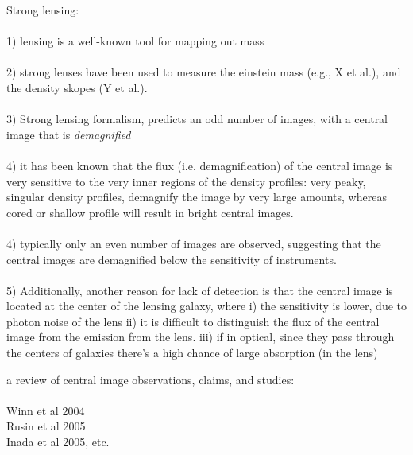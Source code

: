 \documentclass[chicago]{emulateapj}
\begin{document}
\begin{framed}
Strong lensing: \\  \\
1) lensing is a well-known tool for mapping out mass \\ \\
2) strong lenses have been used to measure the einstein mass (e.g., X et al.), and the density skopes (Y et al.). \\ \\
3) Strong lensing formalism, predicts an odd number of images, with a central image that is \emph{demagnified} \\ \\
4) it has been known that the flux (i.e. demagnification) of the central image is very sensitive to the very inner regions of the density profiles: very peaky, singular density profiles, demagnify the image by very large amounts, whereas cored or shallow profile will result in bright central images. \\ \\

4) typically only an even number of images are observed,  suggesting that the central images are demagnified below the sensitivity of instruments. \\ \\

5) Additionally, another reason for lack of detection is that the central image is located at the center of the lensing galaxy, where i) the sensitivity is lower, due to photon noise of the lens ii) it is difficult to distinguish the flux of the central image from the emission from the lens. iii) if in optical, since they pass through the centers of galaxies there's a high chance of large absorption (in the lens)
\end{framed}


\begin{framed}
a review of central image observations, claims, and studies:\\ \\
Winn et al 2004 \\ Rusin et al 2005 \\Inada et al 2005, etc.
\end{framed}
\end{document}
